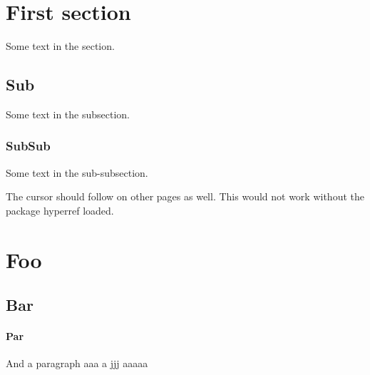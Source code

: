 \documentclass{article}
\begin{document}
\section {First section}

Some text in the section.  
 
\subsection {Sub}
  
Some text in the subsection.

\subsubsection {SubSub} 

Some text in the sub-subsection. 

\newpage

The cursor should follow on other pages as well. 
This would not work without the package hyperref loaded.


\section{Foo}

\subsection {Bar}

\paragraph {Par}

And a paragraph aaa a jjj aaaaa
\end{document}
